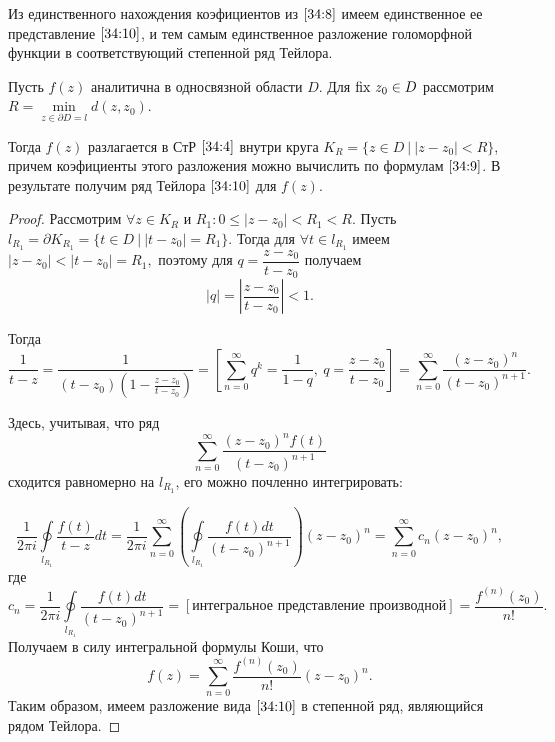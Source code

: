 \documentclass[../../main.tex]{subfiles}
\begin{document}
Из единственного нахождения коэфициентов из $ \eqref{34:8} $ имеем 
единственное ее представление $ \eqref{34:10} $, и тем самым единственное 
разложение голоморфной функции в соответствующий степенной ряд Тейлора.

\begin{thm}
	Пусть $ f(z) $ аналитична в односвязной области $ D $. Для $ \operatorname{fix}\, z_0 \in D 
	$ рассмотрим $ R = \underset{z \in \partial D = l}{\min}d(z, z_0) $.
	
	Тогда $ f(z) $ разлагается в СтР $ \eqref{34:4} $ внутри круга $ K_R = \{z 
	\in D\ |\ |z - z_0| < R \} $, причем коэфициенты этого разложения можно 
	вычислить по формулам $ \eqref{34:9} $.
	В результате получим ряд Тейлора $ \eqref{34:10} $ для $f(z)$.
\end{thm}

\begin{proof}
	Рассмотрим $ \forall z \in K_R $ и $R_1 : 0 \le |z - z_0| < R_1 < R$.
	Пусть $ l_{R_1} = \partial K_{R_1} = \{t \in D\ |\ |t - z_0| = R_1 \} $. 
	Тогда для $ \forall t \in l_{R_1} $ имеем
	$ |z - z_0| < |t - z_0| = R_1, $
	поэтому для $ q = \dfrac{z - z_0}{t - z_0} $ получаем
	\[ |q| = \left|\frac{z - z_0}{t - z_0}\right| < 1. \]
	
	Тогда
	\[ \frac{1}{t - z} = \frac{1}{(t - z_0)(1 - \frac{z - z_0}{t - z_0})} = 
	\left[ \sum\limits_{n = 0}^{\infty}q^k = \frac{1}{1 - q},\ q = \frac{z - 
	z_0}{t - z_0} \right] = \sum\limits_{n = 0}^{\infty}\frac{(z - z_0)^n}{(t - 
	z_0)^{n + 1}}. \]
	
	Здесь, учитывая, что ряд
	\[ \sum\limits_{n = 0}^{\infty}\frac{(z - z_0)^n f(t)}{(t - z_0)^{n + 1}} \]
	сходится равномерно на $ l_{R_1} $, его можно почленно интегрировать:
	
	\[ \frac{1}{2 \pi i} \underset{l_{R_1}}\oint \frac{f(t)}{t - z} dt = 
	\frac{1}{2 \pi i} \sum\limits_{n = 0}^{\infty} \left( 
	\underset{l_{R_1}}\oint\frac{f(t)dt}{(t - z_0)^{n + 1}} \right)(z - z_0)^n = 
	\sum\limits_{n = 0}^{\infty} c_n (z - z_0)^n, \]
	где
	\[ c_n = \frac{1}{2 \pi i} \underset{l_{R_1}}\oint\frac{f(t)dt}{(t - z_0)^{n 
	+ 
	1}} = [\text{интегральное представление производной}] = 
	\frac{f^{(n)}(z_0)}{n!}. \]
	Получаем в силу интегральной формулы Коши, что
	\[ f(z) = \sum\limits_{n = 0}^{\infty} \frac{f^{(n)}(z_0)}{n!} (z - z_0)^n. \]
	Таким образом, имеем разложение вида $ \eqref{34:10} $ в степенной ряд, 
	являющийся рядом 
	Тейлора.
 \end{proof}
\end{document}
